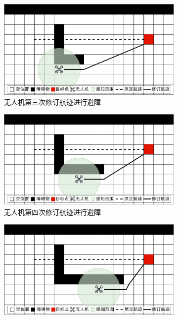 \begin{figure}[!htbp]
\begin{subfigure}[t]{0.48\textwidth}
        \begin{minipage}[b]{\linewidth}
            \includegraphics[width=\textwidth]{images/单无人机避障步骤示例3.pdf}
            \caption{无人机第三次修订航迹进行避障}
            \label{fig:单无人机第三次修订航迹进行避障}
        \end{minipage}
    \end{subfigure}
    \begin{subfigure}[t]{0.48\textwidth}
        \captionsetup{justification=centering}
        \begin{minipage}[b]{\linewidth}
            \includegraphics[width=\textwidth]{images/单无人机避障步骤示例4.pdf}
            \caption{无人机第四次修订航迹进行避障}
            \label{fig:单无人机第四次修订航迹进行避障}
        \end{minipage}
    \end{subfigure}
    \begin{subfigure}[t]{0.48\textwidth}
        \captionsetup{justification=centering}
        \begin{minipage}[b]{\linewidth}
            \includegraphics[width=\textwidth]{images/单无人机避障步骤示例5.pdf}

\end{minipage}
\end{subfigure}
\end{figure}
